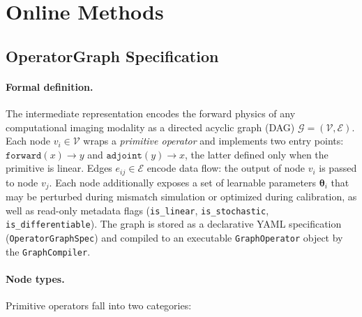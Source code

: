 
\section*{Online Methods}

\subsection*{OperatorGraph Specification}
\label{sec:methods:operatorgraph}

\paragraph{Formal definition.}
The \opg{} intermediate representation encodes the forward physics of any
computational imaging modality as a directed acyclic graph (DAG)
$\mathcal{G} = (\mathcal{V}, \mathcal{E})$.
Each node $v_i \in \mathcal{V}$ wraps a \emph{primitive operator} and
implements two entry points: $\texttt{forward}(x) \to y$ and
$\texttt{adjoint}(y) \to x$, the latter defined only when the primitive
is linear.  Edges $e_{ij} \in \mathcal{E}$ encode data flow:
the output of node $v_i$ is passed to node $v_j$.
Each node additionally exposes a set of learnable parameters
$\boldsymbol{\theta}_i$ that may be perturbed during mismatch simulation
or optimized during calibration, as well as read-only metadata flags
(\texttt{is\_linear}, \texttt{is\_stochastic}, \texttt{is\_differentiable}).
The graph is stored as a declarative YAML specification
(\texttt{OperatorGraphSpec}) and compiled to an executable
\texttt{GraphOperator} object by the \texttt{GraphCompiler}.

\paragraph{Node types.}
Primitive operators fall into two categories:

